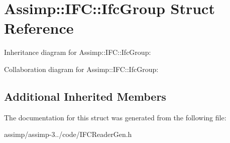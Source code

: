 \hypertarget{struct_assimp_1_1_i_f_c_1_1_ifc_group}{\section{Assimp\+:\+:I\+F\+C\+:\+:Ifc\+Group Struct Reference}
\label{struct_assimp_1_1_i_f_c_1_1_ifc_group}
}


Inheritance diagram for Assimp\+:\+:I\+F\+C\+:\+:Ifc\+Group\+:


Collaboration diagram for Assimp\+:\+:I\+F\+C\+:\+:Ifc\+Group\+:
\subsection*{Additional Inherited Members}


The documentation for this struct was generated from the following file\+:\begin{DoxyCompactItemize}
\item 
assimp/assimp-\/3../code/I\+F\+C\+Reader\+Gen.\+h\end{DoxyCompactItemize}

